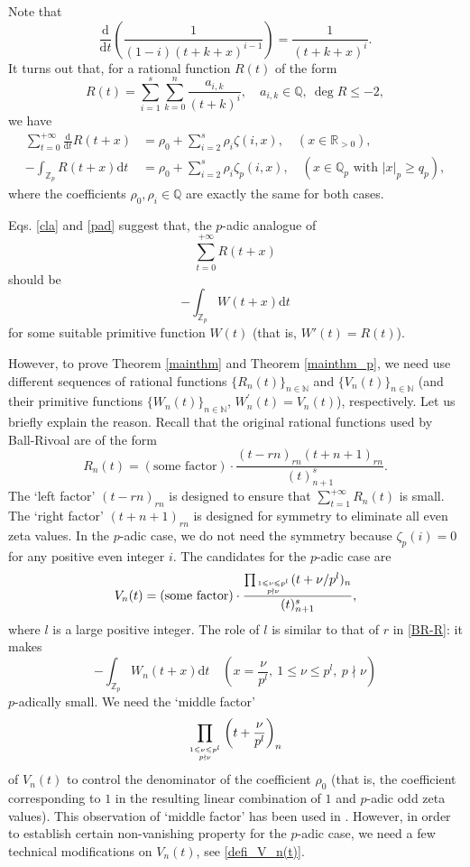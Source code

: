 \documentclass[12pt]{article}
\numberwithin{equation}{section}
\begin{document}
Note that
\[ \frac{\mathrm{d}}{\mathrm{d}t}\left( \frac{1}{(1-i)(t+k+x)^{i-1}} \right) = \frac{1}{(t+k+x)^i}. \]
It turns out that, for a rational function $R(t)$ of the form
\[ R(t) =\sum_{i=1}^{s}\sum_{k=0}^{n} \frac{a_{i,k}}{(t+k)^i}, \quad a_{i,k} \in \mathbb{Q}, ~\deg R \leqslant -2, \] 
we have
\begin{align}
\sum_{t=0}^{+\infty} \frac{\mathrm{d}}{\mathrm{d}t}R(t+x) &= \rho_0 + \sum_{i=2}^{s} \rho_i \zeta(i,x), \quad (x \in \mathbb{R}_{>0}), \label{cla}\\
-\int_{\mathbb{Z}_p} R(t+x)\mathrm{d}t &= \rho_0 + \sum_{i=2}^{s} \rho_i \zeta_p(i,x), \quad (x \in \mathbb{Q}_p \text{~with~} |x|_p \geqslant q_p), \label{pad}
\end{align} 
where the coefficients $\rho_0, \rho_i \in \mathbb{Q}$ are exactly the same for both cases.

Eqs. \eqref{cla} and \eqref{pad} suggest that, the $p$-adic analogue of 
\[ \sum_{t=0}^{+\infty} R(t+x) \]
should be
\[ -\int_{\mathbb{Z}_p} W(t+x)\mathrm{d}t \]
for some suitable primitive function $W(t)$ (that is, $W'(t) = R(t)$). 

\bigskip

However, to prove Theorem \ref{mainthm} and Theorem \ref{mainthm_p}, we need use different sequences of rational functions $\{ R_n(t) \}_{n \in \mathbb{N}}$ and $\{ V_n(t) \}_{n \in \mathbb{N}}$ (and their primitive functions $\{ W_n(t)\}_{n \in \mathbb{N}}$, $W^{\prime}_n(t)=V_n(t)$), respectively. Let us briefly explain the reason. Recall that the original rational functions used by Ball-Rivoal \cite{BR2001} are of the form
\begin{equation}\label{BR-R}
R_n(t) = (\text{some factor}) \cdot \frac{(t-rn)_{rn}(t+n+1)_{rn}}{(t)_{n+1}^s}. 
\end{equation}
The `left factor' $(t-rn)_{rn}$ is designed to ensure that $\sum_{t=1}^{+\infty} R_n(t)$ is small. The `right factor' $(t+n+1)_{rn}$ is designed for symmetry to eliminate all even zeta values. In the $p$-adic case, we do not need the symmetry because $\zeta_p(i) = 0$ for any positive even integer $i$. The candidates for the $p$-adic case are
\[ V_n(t) = (\text{some factor}) \cdot \frac{\prod_{1 \leqslant \nu \leqslant p^l \atop p \nmid \nu} (t+\nu/p^l)_{n}}{(t)_{n+1}^s}, \]
where $l$ is a large positive integer. The role of $l$ is similar to that of $r$ in \eqref{BR-R}: it makes
\[ -\int_{\mathbb{Z}_p} W_n(t+x)\mathrm{d}t \quad \left(x = \frac{\nu}{p^l},~1\leqslant \nu \leqslant p^l,~ p \nmid \nu \right) \] $p$-adically small. We need the `middle factor'
\[ \prod_{1 \leqslant \nu \leqslant p^l \atop p \nmid \nu} \left(t+\frac{\nu}{p^l}\right)_{n}  \] 
of $V_n(t)$ to control the denominator of the coefficient $\rho_0$ (that is, the coefficient corresponding to $1$ in the resulting linear combination of $1$ and $p$-adic odd zeta values). This observation of `middle factor' has been used in \cite{FSZ2019,LY2020,LS2023+}. However, in order to establish certain non-vanishing property for the $p$-adic case, we need a few technical modifications on $V_n(t)$, see \eqref{defi_V_n(t)}.
\end{document}
